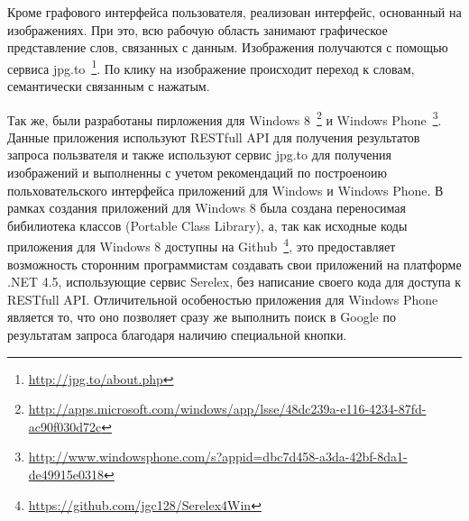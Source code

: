 \documentclass[a4paper,10pt,twoside]{article}
\begin{document}

Кроме графового интерфейса пользователя, реализован интерфейс, основанный на изображениях. При это, всю рабочую область занимают графическое представление слов, связанных с данным. Изображения получаются с помощью сервиса jpg.to~\footnote{\url{http://jpg.to/about.php}}. По клику на изображение происходит переход к словам, семантически связанным с нажатым.


Так же, были разработаны пирложения для Windows 8~\footnote{\url{http://apps.microsoft.com/windows/app/lsse/48dc239a-e116-4234-87fd-ac90f030d72c}} и Windows Phone~\footnote{\url{http://www.windowsphone.com/s?appid=dbc7d458-a3da-42bf-8da1-de49915e0318}}. Данные приложения используют RESTfull API для получения результатов запроса пользвателя и также используют сервис jpg.to для получения изображений и выполненны с учетом рекомендаций по построеноию польховательского интерфейса приложений для Windows и Windows Phone. В рамках создания приложений для Windows 8 была создана переносимая бибилиотека классов (Portable Class Library), а, так как исходные коды приложения для Windows 8 доступны на Github~\footnote{\url{https://github.com/jgc128/Serelex4Win}}, это предоставляет возможность сторонним программистам создавать свои приложений на платформе .NET 4.5, использующие сервис Serelex, без написание своего кода для доступа к RESTfull API. Отличительной особеностью приложения для Windows Phone является то, что оно 
позволяет сразу же выполнить поиск в Google по результатам запроса благодаря наличию специальной кнопки.


\end{document}
